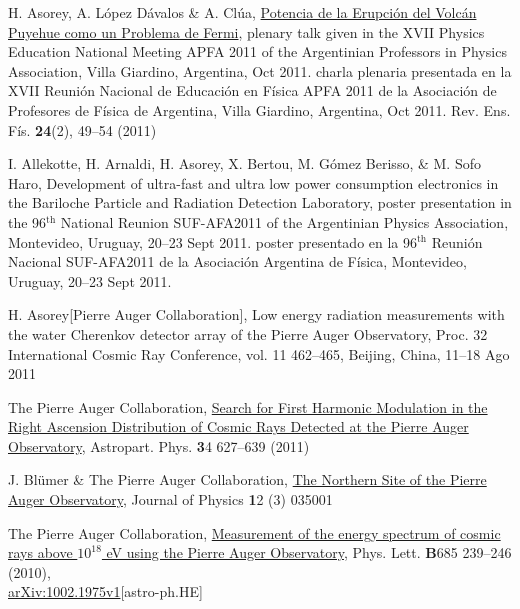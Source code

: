 \begin{etaremune}
\item {}H. Asorey, A. López Dávalos \& A. Clúa, \href{https://dialnet.unirioja.es/servlet/articulo?codigo=4026852}{{Potencia de la Erupción del Volcán Puyehue como un Problema de Fermi}}, \ifeng plenary talk given in the XVII Physics Education National Meeting APFA 2011 of the Argentinian Professors in Physics Association, Villa Giardino, Argentina, Oct 2011. \else charla plenaria presentada en la XVII Reunión Nacional de Educación en Física APFA 2011 de la Asociación de Profesores de Física de Argentina, Villa Giardino, Argentina, Oct 2011. \fi Rev. Ens. Fís. {\textbf{24}}(2), 49--54 (2011)

\item {}I. Allekotte, H. Arnaldi, H. Asorey, X. Bertou, M. Gómez Berisso, \& M. Sofo Haro, {{Development of ultra-fast and ultra low power consumption electronics in the Bariloche Particle and Radiation Detection Laboratory}},
\ifeng
poster presentation in the 96$^{\mathrm{th}}$ National Reunion SUF-AFA2011 of the Argentinian Physics Association, Montevideo, Uruguay, 20--23 Sept 2011.
\else
poster presentado en la 96$^{\mathrm{th}}$ Reunión Nacional SUF-AFA2011 de la Asociación Argentina de Física, Montevideo, Uruguay, 20--23 Sept 2011.
\fi

\item {}H. Asorey[Pierre Auger Collaboration], {{Low energy radiation
measurements with the water Cherenkov detector array of the Pierre Auger
Observatory}}, \en Proc.
32 International Cosmic Ray Conference, vol.
11
462--465, Beijing, China, 11--18 Ago 2011

\item {}The Pierre Auger Collaboration,
\href{http://dx.doi.org/10.1016/j.astropartphys.2010.12.007}{{Search for
First Harmonic Modulation in the Right Ascension Distribution of Cosmic Rays
Detected at the Pierre Auger Observatory}}, Astropart.
Phys. {\textbf 34} 627--639
(2011)

\item {}J. Blümer \& The Pierre Auger Collaboration,
\href{http://dx.doi.org/10.1088/1367-2630/12/3/035001}{{The Northern Site
of the Pierre Auger Observatory}}, Journal of Physics {\textbf 12} (3) 035001

\item {}The Pierre Auger Collaboration,
\href{http://dx.doi.org/10.1016/j.physletb.2010.02.013}{{Measurement of
the energy spectrum of cosmic rays above $10^{18}$ eV using the Pierre Auger
Observatory}}, Phys.
Lett. {\textbf B685} 239--246 (2010),\\
\href{http://arxiv.org/abs/1002.1975}{arXiv:1002.1975v1}[astro-ph.HE]


\end{etaremune}
